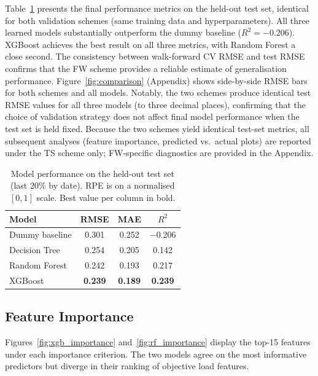 \documentclass[10pt, twocolumn]{article}
\begin{document}
Table~\ref{tab:results} presents the final performance metrics on the
held-out test set, identical for both validation schemes (same training
data and hyperparameters). All three learned models substantially outperform
the dummy baseline ($R^2 = -0.206$). XGBoost achieves the best result on all
three metrics, with Random Forest a close second. The consistency between
walk-forward CV RMSE and test RMSE confirms that the FW scheme provides a
reliable estimate of generalisation performance. Figure~\ref{fig:comparison}
(Appendix) shows side-by-side RMSE bars for both schemes and all models.
Notably, the two schemes produce identical test RMSE values for all
three models (to three decimal places), confirming that the choice
of validation strategy does not affect final model performance when
the test set is held fixed. Because the two schemes yield identical
test-set metrics, all subsequent analyses (feature importance,
predicted vs.\ actual plots) are reported under the TS scheme only;
FW-specific diagnostics are provided in the Appendix.

\begin{table}[htbp]
  \centering
  \small
  \caption{Model performance on the held-out test set (last 20\% by date).
           RPE is on a normalised $[0,1]$ scale. Best value per column
           in bold.}
  \label{tab:results}
  \begin{tabular}{lccc}
    \toprule
    Model & RMSE & MAE & $R^2$ \\
    \midrule
    Dummy baseline & 0.301 & 0.252 & $-$0.206 \\
    Decision Tree  & 0.254 & 0.205 & 0.142 \\
    Random Forest  & 0.242 & 0.193 & 0.217 \\
    XGBoost        & \textbf{0.239} & \textbf{0.189} & \textbf{0.239} \\
    \bottomrule
  \end{tabular}
\end{table}

\subsection{Feature Importance}
\label{subsec:importance}

Figures~\ref{fig:xgb_importance} and~\ref{fig:rf_importance}
display the top-15 features under each importance criterion.
The two models agree on the most informative predictors but diverge
in their ranking of objective load features.
\end{document}

